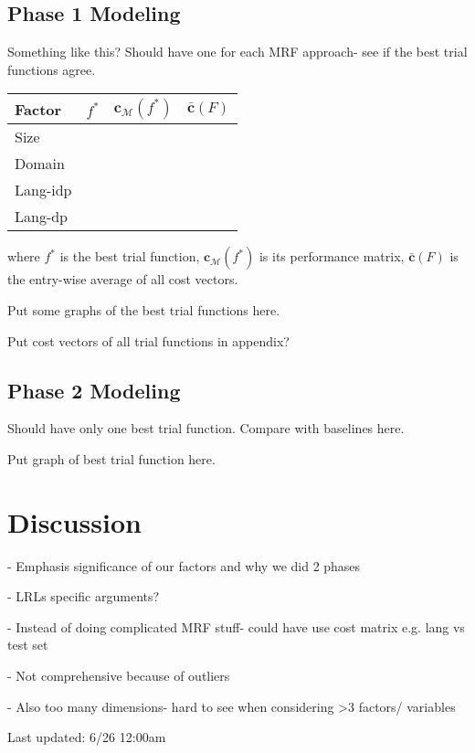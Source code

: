 \documentclass[11pt]{article}
\begin{document}
\subsection{Phase 1 Modeling}
Something like this?
Should have one for each MRF approach- see if the best trial functions agree. 
\begin{center}
\begin{tabular}{l|c|c|c}
    \textbf{Factor} & \textbf{$f^*$} & $\textbf{c}_{\mathcal{M}}(f^*)$ &  $\bar{\textbf{c}}(F)$\\
     \hline 
     Size & & &\\
     Domain & & &\\
     Lang-idp & & &\\
     Lang-dp & & &
\end{tabular}
\end{center}
where $f^*$ is the best trial function, $\textbf{c}_{\mathcal{M}}(f^*)$ is its performance matrix, $\bar{\textbf{c}}(F)$ is the entry-wise average of all cost vectors.

Put some graphs of the best trial functions here.

Put cost vectors of all trial functions in appendix?

\subsection{Phase 2 Modeling}
Should have only one best trial function. Compare with baselines here.

Put graph of best trial function here.

\section{Discussion}
- Emphasis significance of our factors and why we did 2 phases

- LRLs specific arguments?

- Instead of doing complicated MRF stuff- could have use cost matrix e.g. lang vs test set

- Not comprehensive because of outliers

- Also too many dimensions- hard to see when considering >3 factors/ variables

Last updated: 6/26 12:00am
\end{document}
